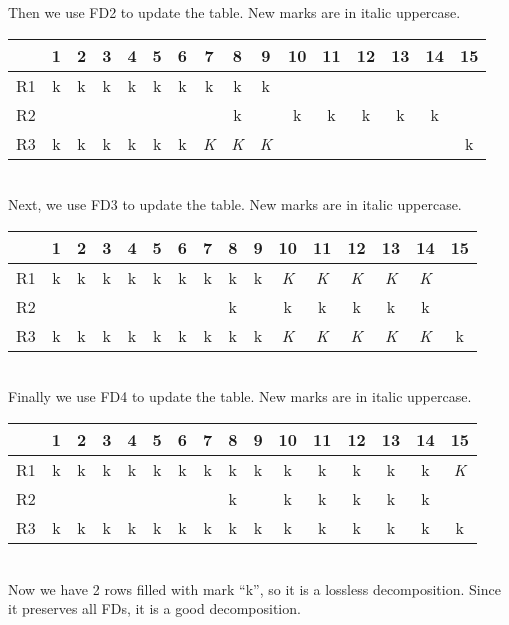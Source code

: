 \begin{enumerate}
Then we use FD2 to update the table. New marks are in italic uppercase.

\begin{tabular}{|c|c|c|c|c|c|c|c|c|c|c|c|c|c|c|c|}
\hline 
& 1 & 2 & 3 & 4 & 5 & 6 & 7 & 8 & 9 & 10 & 11 & 12 & 13 & 14 & 15 \\ 
\hline 
R1 & k & k & k & k & k & k & k & k & k &  &  &  &  &  &  \\ 
\hline 
R2 &  &  &  &  &  &  &  & k &  & k & k & k & k & k &  \\ 
\hline 
R3 & k & k & k & k & k & k & \textit{K} & \textit{K} & \textit{K} &  &  &  &  &  & k \\ 
\hline 
\end{tabular} \\

Next, we use FD3 to update the table. New marks are in italic uppercase.

\begin{tabular}{|c|c|c|c|c|c|c|c|c|c|c|c|c|c|c|c|}
\hline 
& 1 & 2 & 3 & 4 & 5 & 6 & 7 & 8 & 9 & 10 & 11 & 12 & 13 & 14 & 15 \\ 
\hline 
R1 & k & k & k & k & k & k & k & k & k & \textit{K} & \textit{K} & \textit{K} & \textit{K} & \textit{K} &  \\ 
\hline 
R2 &  &  &  &  &  &  &  & k &  & k & k & k & k & k &  \\ 
\hline 
R3 & k & k & k & k & k & k & k & k & k & \textit{K} & \textit{K} & \textit{K} & \textit{K} & \textit{K} & k \\ 
\hline 
\end{tabular} \\

Finally we use FD4 to update the table. New marks are in italic uppercase.

\begin{tabular}{|c|c|c|c|c|c|c|c|c|c|c|c|c|c|c|c|}
\hline 
& 1 & 2 & 3 & 4 & 5 & 6 & 7 & 8 & 9 & 10 & 11 & 12 & 13 & 14 & 15 \\ 
\hline 
R1 & k & k & k & k & k & k & k & k & k & k & k & k & k & k & \textit{K} \\ 
\hline 
R2 &  &  &  &  &  &  &  & k &  & k & k & k & k & k &  \\ 
\hline 
R3 & k & k & k & k & k & k & k & k & k & k & k & k & k & k & k \\ 
\hline 
\end{tabular} \\

Now we have 2 rows filled with mark ``k'', so it is a lossless decomposition. Since it preserves all FDs, it is a good decomposition.
\end{enumerate}

